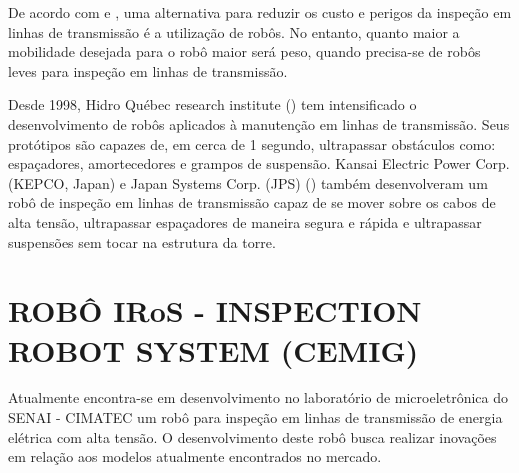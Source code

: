 \documentclass[12pt,oneside,a4paper, chapter=TITLE, section = TITLE, english, brazil]{abntex2}
\begin{document}
De acordo com  e , uma alternativa para reduzir os custo e perigos da inspeção em linhas de transmissão é a utilização de robôs. No entanto, quanto maior a mobilidade desejada para o robô maior será peso, quando precisa-se de robôs leves para inspeção em linhas de transmissão.

Desde 1998, Hidro Québec research institute (\cite{transmission}) tem intensificado o desenvolvimento de robôs aplicados à manutenção em linhas de transmissão. Seus protótipos são capazes de, em cerca de 1 segundo, ultrapassar obstáculos como: espaçadores, amortecedores e grampos de suspensão. Kansai Electric Power Corp. (KEPCO, Japan) e Japan Systems Corp. (JPS) (\cite{expliner}) também desenvolveram um robô de inspeção em linhas de transmissão capaz de se mover sobre os cabos de alta tensão, ultrapassar espaçadores de maneira segura e rápida e ultrapassar suspensões sem tocar na estrutura da torre.


\section{ROBÔ IRoS - INSPECTION ROBOT SYSTEM (CEMIG)}




Atualmente encontra-se em desenvolvimento no laboratório de microeletrônica do SENAI - CIMATEC um robô para inspeção em linhas de transmissão de energia elétrica com alta tensão. O desenvolvimento deste robô busca realizar inovações em relação aos modelos atualmente encontrados no mercado.
\end{document}
